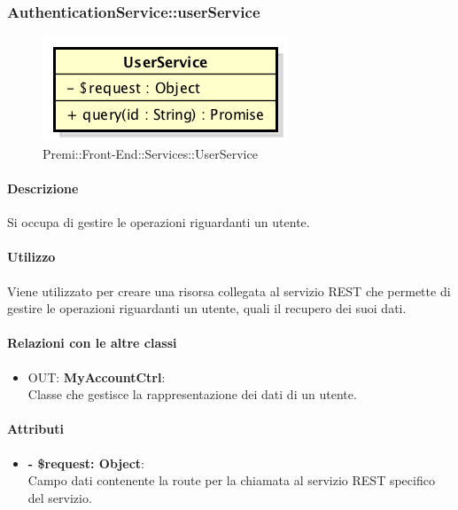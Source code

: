 		
		\subsubsection{AuthenticationService::userService}
		\begin{figure}[h]
			\centering
				\includegraphics[width=0.4\linewidth]{img/premi_front_end_services_userservice}
			\caption[Premi::Front-End::Services::UserService]{Premi::Front-End::Services::UserService}
		\end{figure}
		
		\paragraph{Descrizione}
		Si occupa di gestire le operazioni riguardanti un utente.
		
		\paragraph{Utilizzo}
		Viene utilizzato per creare una risorsa collegata al servizio REST che permette di gestire le operazioni riguardanti un utente, quali il recupero dei suoi dati.
		
		\paragraph{Relazioni con le altre classi}
		\begin{itemize}
			\item OUT: \textbf{MyAccountCtrl}:\\
			Classe che gestisce la rappresentazione dei dati di un utente.
		\end{itemize}
		
		\paragraph{Attributi}
		\begin{itemize}
			\item \textbf{- \$request: Object}:\\
			Campo dati contenente la route per la chiamata al servizio REST specifico del servizio.
		\end{itemize}	
		

